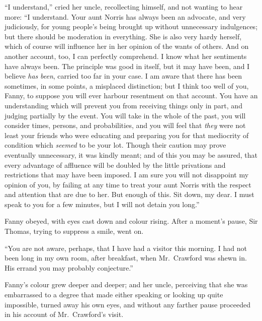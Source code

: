 ``I understand,'' cried her uncle, recollecting himself,
and not wanting to hear more:  ``I understand.  Your aunt
Norris has always been an advocate, and very judiciously,
for young people's being brought up without unnecessary
indulgences; but there should be moderation in everything.
She is also very hardy herself, which of course will
influence her in her opinion of the wants of others.
And on another account, too, I can perfectly comprehend.
I know what her sentiments have always been.
The principle was good in itself, but it may have been,
and I believe \emph{has} \emph{been}, carried too far in your case.
I am aware that there has been sometimes, in some points,
a misplaced distinction; but I think too well of you, Fanny,
to suppose you will ever harbour resentment on that account.
You have an understanding which will prevent you from
receiving things only in part, and judging partially
by the event.  You will take in the whole of the past,
you will consider times, persons, and probabilities,
and you will feel that \emph{they} were not least your
friends who were educating and preparing you for that
mediocrity of condition which \emph{seemed} to be your lot.
Though their caution may prove eventually unnecessary,
it was kindly meant; and of this you may be assured,
that every advantage of affluence will be doubled by the little
privations and restrictions that may have been imposed.
I am sure you will not disappoint my opinion of you,
by failing at any time to treat your aunt Norris
with the respect and attention that are due to her.
But enough of this.  Sit down, my dear.  I must speak
to you for a few minutes, but I will not detain
you long.''

Fanny obeyed, with eyes cast down and colour rising.
After a moment's pause, Sir Thomas, trying to suppress
a smile, went on.

``You are not aware, perhaps, that I have had a visitor
this morning.  I had not been long in my own room,
after breakfast, when Mr.\ Crawford was shewn in.
His errand you may probably conjecture.''

Fanny's colour grew deeper and deeper; and her uncle,
perceiving that she was embarrassed to a degree that
made either speaking or looking up quite impossible,
turned away his own eyes, and without any farther pause
proceeded in his account of Mr.\ Crawford's visit.

